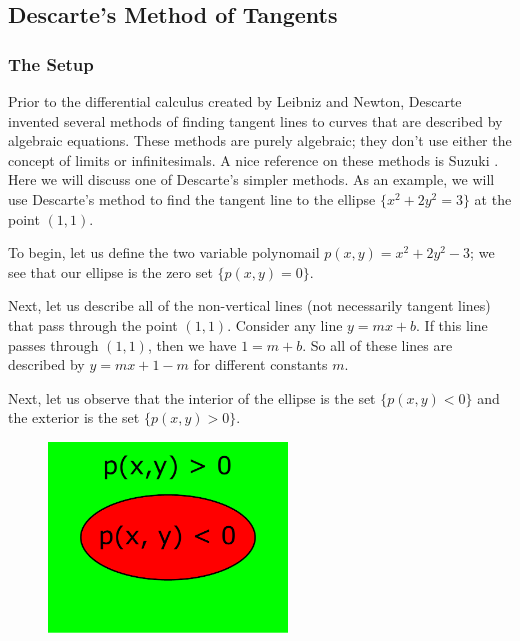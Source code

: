 \subsection{Descarte's Method of Tangents}

\subsubsection*{The Setup}

Prior to the differential calculus created by Leibniz and Newton, Descarte invented several methods of 
finding tangent lines to curves that are described by algebraic equations. These methods are purely
algebraic; they don't use either the concept of limits or infinitesimals. A nice reference on these
methods is Suzuki \cite{descarte}. Here we will discuss one of Descarte's simpler methods. As an example,
we will use Descarte's method to find the tangent line to the ellipse \(\{x^2 + 2y^2 = 3\}\) at the
point \((1,1)\).

To begin, let us define the two variable polynomail \(p(x,y) = x^2 + 2y^2 - 3\); we see that our ellipse is
the zero set \(\{p(x,y) = 0\} \).

Next, let us describe all of the non-vertical lines (not necessarily tangent lines) that pass through the 
point \((1,1)\). Consider any line \(y = mx + b\). If this line passes through \((1,1)\), then we have
\(1 = m + b\). So all of these lines are described by \(y = mx + 1 - m\) for different constants \(m\).

Next, let us observe that the interior of the ellipse is the set \(\{p(x,y) < 0\}\) and the exterior
is the set \(\{p(x,y) > 0\}\).
\begin{figure}[h]
\centering
\includegraphics[width=2.5in]{preCalculus/signPoly.pdf}
\end{figure}

